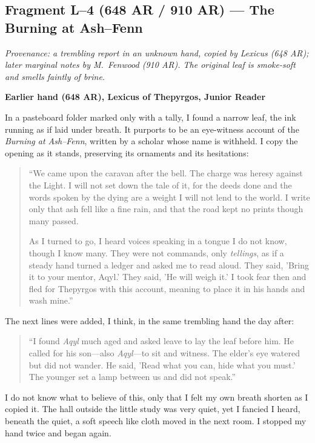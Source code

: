 \documentclass[11pt]{article}
\begin{document}
\subsection{Fragment L--4 (648 AR / 910 AR) --- The Burning at Ash--Fenn}
\label{frag:l4}
{}

\noindent\textit{Provenance: a trembling report in an unknown hand, copied by Lexicus (648 AR); later marginal notes by M.\ Fenwood (910 AR). The original leaf is smoke-soft and smells faintly of brine.}

\medskip
\noindent\textbf{Earlier hand (648 AR), Lexicus of Thepyrgos, Junior Reader}

In a pasteboard folder marked only with a tally, I found a narrow leaf, the ink running as if laid under breath. It purports to be an eye-witness account of the \textit{Burning at Ash--Fenn}, written by a scholar whose name is withheld. I copy the opening as it stands, preserving its ornaments and its hesitations:

\begin{quote}\small
``We came upon the caravan after the bell. The charge was heresy against the Light. I will not set down the tale of it, for the deeds done and the words spoken by the dying are a weight I will not lend to the world. I write only that ash fell like a fine rain, and that the road kept no prints though many passed. 

As I turned to go, I heard voices speaking in a tongue I do not know, though I know many. They were not commands, only \emph{tellings}, as if a steady hand turned a ledger and asked me to read aloud. They said, 'Bring it to your mentor, Aqyl.' They said, 'He will weigh it.' I took fear then and fled for Thepyrgos with this account, meaning to place it in his hands and wash mine.''
\end{quote}

The next lines were added, I think, in the same trembling hand the day after:

\begin{quote}\small
``I found \textit{Aqyl} much aged and asked leave to lay the leaf before him. He called for his son---also \textit{Aqyl}---to sit and witness. The elder's eye watered but did not wander. He said, 'Read what you can, hide what you must.' The younger set a lamp between us and did not speak.''
\end{quote}

I do not know what to believe of this, only that I felt my own breath shorten as I copied it. The hall outside the little study was very quiet, yet I fancied I heard, beneath the quiet, a soft speech like cloth moved in the next room. I stopped my hand twice and began again.
\end{document}
